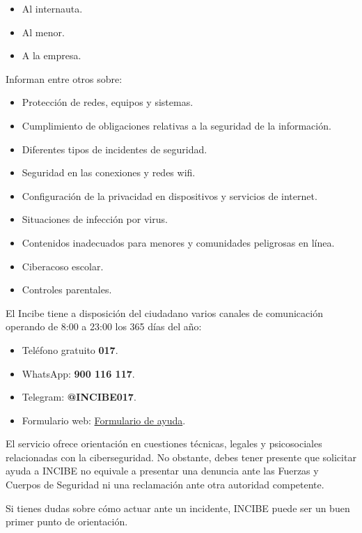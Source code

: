 \documentclass[
  spanish,
  a4paper,
  openany]{book}
\begin{document}
\begin{itemize}
\item
  Al internauta.
\item
  Al menor.
\item
  A la empresa.
\end{itemize}

Informan entre otros sobre:

\begin{itemize}
\item
  Protección de redes, equipos y sistemas.
\item
  Cumplimiento de obligaciones relativas a la seguridad de la información.
\item
  Diferentes tipos de incidentes de seguridad.
\item
  Seguridad en las conexiones y redes wifi.
\item
  Configuración de la privacidad en dispositivos y servicios de internet.
\item
  Situaciones de infección por virus.
\item
  Contenidos inadecuados para menores y comunidades peligrosas en línea.
\item
  Ciberacoso escolar.
\item
  Controles parentales.
\end{itemize}

El Incibe tiene a disposición del ciudadano varios canales de comunicación operando de 8:00 a 23:00 los 365 días del año:

\begin{itemize}
\item
  Teléfono gratuito \textbf{017}.
\item
  WhatsApp: \textbf{900 116 117}.
\item
  Telegram: \textbf{@INCIBE017}.
\item
  Formulario web: \href{http://incibe.es/linea-de-ayuda-en-ciberseguridad\#formulario}{Formulario de ayuda}.
\end{itemize}

El servicio ofrece orientación en cuestiones técnicas, legales y psicosociales relacionadas con la ciberseguridad. No obstante, debes tener presente que solicitar ayuda a INCIBE no equivale a presentar una denuncia ante las Fuerzas y Cuerpos de Seguridad ni una reclamación ante otra autoridad competente.

Si tienes dudas sobre cómo actuar ante un incidente, INCIBE puede ser un buen primer punto de orientación.
\end{document}
